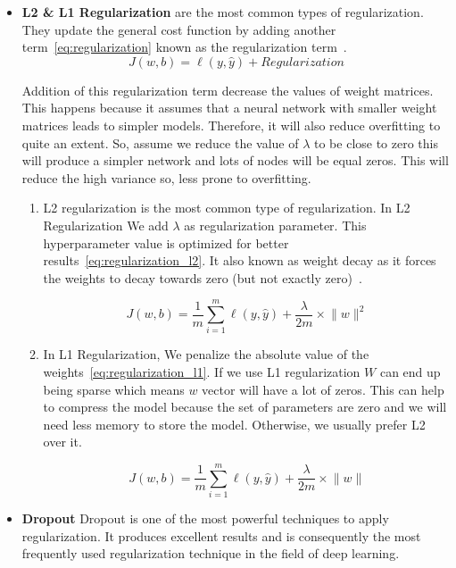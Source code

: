 \begin{itemize}
\item \textbf{L2 \& L1 Regularization} are the most common types of regularization. They update the general cost function by adding another term~\eqref{eq:regularization} known as the regularization term~\cite{Web_Analyticsvidhya_Regularization}.
\begin{equation}\label{eq:regularization}
  J(w,b) =  \ell(y,\widehat{y})  + Regularization
   \end{equation}

   Addition of this regularization term decrease the values of weight matrices. This happens because it assumes that a neural network with smaller weight matrices leads to simpler models. Therefore, it will also reduce overfitting to quite an extent. So, assume we reduce the value of $\lambda$ to be close to zero this will produce a simpler network and lots of nodes will be equal zeros. This will reduce the high variance so, less prone to overfitting.
   
   \begin{enumerate}
     \item L2 regularization is the most common type of regularization. In L2 Regularization We add $\lambda$ as regularization parameter. This  hyperparameter value is optimized for better results~\eqref{eq:regularization_l2}. It also known as weight decay as it forces the weights to decay towards zero (but not exactly zero)~\cite{Web_Analyticsvidhya_Regularization}.

       \begin{equation}\label{eq:regularization_l2}
  J(w,b) = \frac{1}{m} \sum_{i=1}^{m} \ell(y,\widehat{y})+\frac{\lambda}{2m} \times \lVert w \rVert^2
\end{equation}

\item In L1 Regularization, We penalize the absolute value of the weights~\eqref{eq:regularization_l1}. If we use L1 regularization  $W$ can end up being sparse which means $w$ vector will have a lot of zeros. This can help to compress the model because the set of parameters are zero and we will need less memory to store the model. Otherwise, we usually prefer L2 over it.

       \begin{equation}\label{eq:regularization_l1}
  J(w,b) = \frac{1}{m} \sum_{i=1}^{m} \ell(y,\widehat{y})+\frac{\lambda}{2m} \times \lVert w \rVert
\end{equation}
     \end{enumerate}
   \item \textbf{Dropout}
Dropout is one of the most powerful techniques to apply regularization. It produces excellent results and is consequently the most frequently used regularization technique in the field of deep learning.


\end{itemize}
